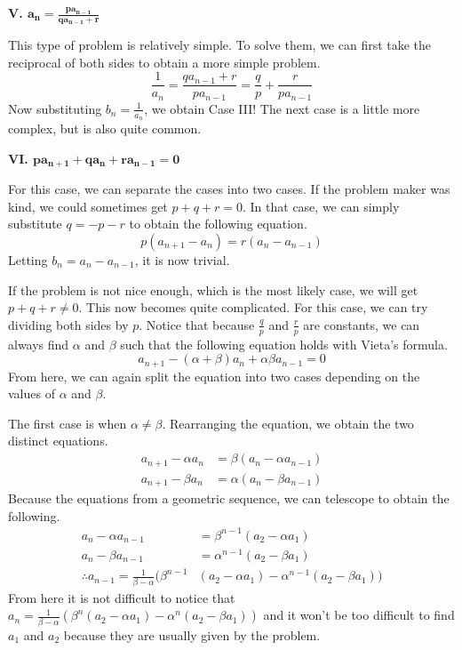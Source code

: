 \documentclass[../../../main.tex]{subfiles}
\begin{document}
{\Large\textcolor{BrickRed}
{\textbf{V. $\mathbf{a_n = \frac{p a_{n-1}}{q a_{n-1} + r}}$}}}

This type of problem is relatively simple. To solve them,
we can first take the reciprocal of both sides to obtain a more
simple problem.
\[
\frac{1}{a_n}
= \frac{q a_{n-1} + r}{p a_{n-1}}
= \frac{q}{p} + \frac{r}{p a_{n-1}}
\]
Now substituting $b_n = \frac{1}{a_n}$, we obtain Case III!
The next case is a little more complex, but is also quite common.

{\Large\textcolor{BrickRed}
{\textbf{VI. $\mathbf{p a_{n+1} + q a_n + r a_{n-1} = 0}$}}}

For this case, we can separate the cases into two cases. If the
problem maker was kind, we could sometimes get $p + q + r = 0$.
In that case, we can simply substitute $q = -p - r$ to obtain
the following equation.
\[
p (a_{n+1} - a_n) = r (a_n - a_{n-1})
\]
Letting $b_n = a_n - a_{n-1}$, it is now trivial.

If the problem is not nice enough, which is the most likely case,
we will get $p + q + r \neq 0$. This now becomes quite complicated.
For this case, we can try dividing both sides by $p$. Notice that
because $\frac{q}{p}$ and $\frac{r}{p}$ are constants, we can always
find $\alpha$ and $\beta$ such that the following equation holds
with Vieta's formula.
\[
a_{n+1} - (\alpha + \beta) a_n + \alpha\beta a_{n-1} = 0
\]
From here, we can again split the equation into two cases depending
on the values of $\alpha$ and $\beta$.

The first case is when $\alpha \neq \beta$. Rearranging the equation,
we obtain the two distinct equations.
\begin{align*}
    a_{n+1} - \alpha a_n &= \beta (a_n - \alpha a_{n-1}) \\
    a_{n+1} - \beta a_n &= \alpha (a_n - \beta a_{n-1})
\end{align*}
Because the equations from a geometric sequence, we can telescope
to obtain the following.
\begin{align*}
    a_n - \alpha a_{n-1} &= \beta^{n-1} (a_2 - \alpha a_1) \\
    a_n - \beta a_{n-1} &= \alpha^{n-1} (a_2 - \beta a_1) \\
    \therefore
    a_{n-1} = \frac{1}{\beta - \alpha} (
        \beta^{n-1} &(a_2 - \alpha a_1) -
        \alpha^{n-1} (a_2 - \beta a_1)
    )
\end{align*}
From here it is not difficult to notice that
$a_n = \frac{1}{\beta - \alpha} (\beta^n (a_2 - \alpha a_1) -
\alpha^n (a_2 - \beta a_1))$ and it won't be too difficult to
find $a_1$ and $a_2$ because they are usually given by the problem.
\end{document}
